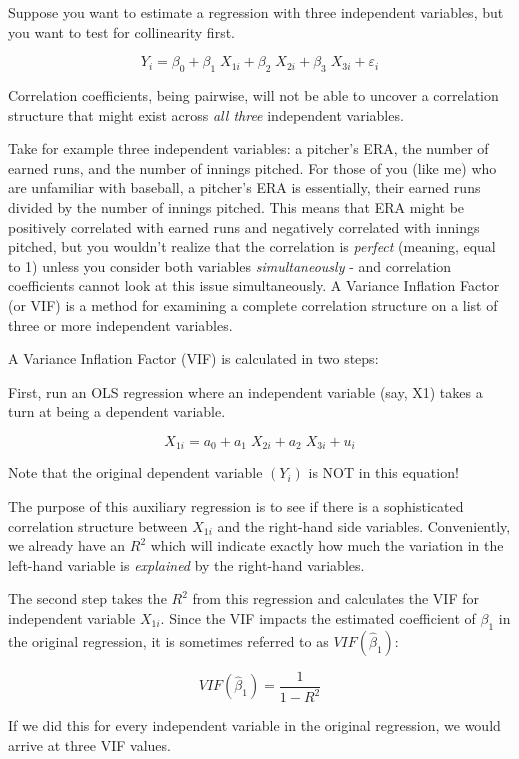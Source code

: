 \documentclass[
]{book}
\begin{document}
Suppose you want to estimate a regression with three independent variables, but you want to test for collinearity first.

\[Y_i = \beta_0 + \beta_1 \; X_{1i} + \beta_2 \; X_{2i} + \beta_3\;  X_{3i} + \varepsilon_i\]

Correlation coefficients, being pairwise, will not be able to uncover a correlation structure that might exist across \emph{all three} independent variables.

Take for example three independent variables: a pitcher's ERA, the number of earned runs, and the number of innings pitched. For those of you (like me) who are unfamiliar with baseball, a pitcher's ERA is essentially, their earned runs divided by the number of innings pitched. This means that ERA might be positively correlated with earned runs and negatively correlated with innings pitched, but you wouldn't realize that the correlation is \emph{perfect} (meaning, equal to 1) unless you consider both variables \emph{simultaneously} - and correlation coefficients cannot look at this issue simultaneously. A Variance Inflation Factor (or VIF) is a method for examining a complete correlation structure on a list of three or more independent variables.

A Variance Inflation Factor (VIF) is calculated in two steps:

First, run an OLS regression where an independent variable (say, X1) takes a turn at being a dependent variable.

\[X_{1i} = a_0 + a_1\;  X_{2i} + a_2 \; X_{3i} + u_i\]

Note that the original dependent variable \((Y_i)\) is NOT in this equation!

The purpose of this auxiliary regression is to see if there is a sophisticated correlation structure between \(X_{1i}\) and the right-hand side variables. Conveniently, we already have an \(R^2\) which will indicate exactly how much the variation in the left-hand variable is \emph{explained} by the right-hand variables.

The second step takes the \(R^2\) from this regression and calculates the VIF for independent variable \(X_{1i}\). Since the VIF impacts the estimated coefficient of \(\beta_1\) in the original regression, it is sometimes referred to as \(VIF(\hat{\beta}_1)\):

\[VIF(\hat{\beta}_1) = \frac{1}{1-R^2}\]

If we did this for every independent variable in the original regression, we would arrive at three VIF values.
\end{document}
